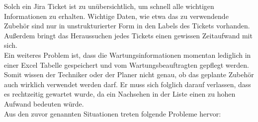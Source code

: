 Solch ein \gls{Jira} Ticket ist zu unübersichtlich, um schnell alle wichtigen 
Informationen zu erhalten. Wichtige Daten, wie etwa das zu verwendende Zubehör
sind nur in unstrukturierter Form in den Labels des Tickets vorhanden. 
Außerdem bringt das Heraussuchen jedes Tickets einen gewissen Zeitaufwand mit sich.\\

Ein weiteres Problem ist, dass die Wartungsinformationen momentan lediglich in einer Excel
Tabelle gespeichert und vom Wartungsbeauftragten gepflegt werden. Somit
wissen der \gls{Techniker} oder der \gls{Planer} nicht genau, ob das geplante 
Zubehör auch wirklich verwendet werden darf. Er muss sich folglich darauf verlassen, 
dass es rechtzeitig gewartet wurde, da ein Nachsehen in der Liste einen zu hohen
Aufwand bedeuten würde.\\

\newpage
Aus den zuvor genannten Situationen treten folgende Probleme hervor:

